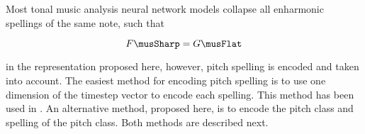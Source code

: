 
Most tonal music analysis neural network models collapse all
enharmonic spellings of the same note, such that 

$$F\musSharp = G\musFlat$$

in the representation proposed here, however, pitch spelling
is encoded and taken into account. The easiest method for
encoding pitch spelling is to use one dimension of the
timestep vector to encode each spelling. This method has
been used in \textcite{micchi2020not, micchi2021deep}. An
alternative method, proposed here, is to encode the pitch
class and spelling of the pitch class. Both methods are
described next.
